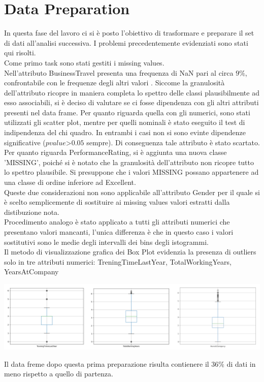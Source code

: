 \documentclass[english]{article}
\begin{document}
\section{Data Preparation}
In questa fase del lavoro ci si è posto l'obiettivo di trasformare e preparare il set di dati all'analisi successiva. I problemi precedentemente evidenziati sono stati qui risolti.\\

Come primo task sono stati gestiti i missing values.\\
Nell'attributo BusinessTravel presenta una frequenza di NaN pari al circa $9\%$, confrontabile con le frequenze degli altri valori . Siccome la granulosità dell'attributo ricopre in maniera completa lo spettro delle classi plausibilmente ad esso associabili, si è deciso di valutare se ci fosse dipendenza con gli altri attributi presenti nel data frame. Per quanto riguarda quella con gli numerici, sono stati utilizzati gli scatter plot, mentre per quelli nominali è stato eseguito il test di indipendenza del chi quadro. In entrambi i casi non si sono evinte dipendenze significative ($p value $>$ 0.05$ sempre). Di conseguenza tale attributo è stato scartato.\\

Per quanto riguarda PerformanceRating, si è aggiunta una nuova classe 'MISSING', poiché si è notato che la granulosità dell'attributo non ricopre tutto lo spettro plausibile. Si presuppone che i valori MISSING possano appartenere ad una classe di ordine inferiore ad Excellent.\\

Queste due considerazioni non sono applicabile all'attributo Gender per il quale si è scelto semplicemente di sostituire ai missing values valori estratti dalla distibuzione nota.\\

Procedimento analogo è stato applicato a tutti gli attributi numerici che presentano valori mancanti, l'unica differenza è che in questo caso i valori sostitutivi sono le medie degli intervalli dei bins degli istogrammi.\\ %

Il metodo di visualizzazione grafica dei Box Plot evidenzia la presenza di outliers solo in tre attributi numerici: TreningTimeLastYear, TotalWorkingYears, YearsAtCompany
\begin{center}
\includegraphics[scale=1]{boxplot.png}
\end{center}
 Il data freme  dopo questa prima preparazione risulta contienere il $36\%$ di dati in meno rispetto a quello di partenza.\\
\end{document}
